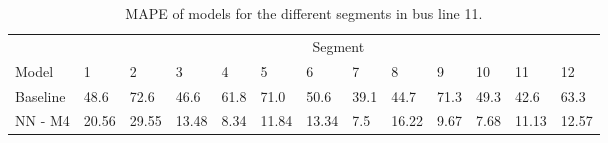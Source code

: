 \begin{table}[H]
	\centering
	\caption{MAPE of models for the different segments in bus line 11.}
	\label{fig:model-mape-of-segs-211}
	\begin{adjustbox}{center}
	\begin{tabular}{ l | l | l | l | l | l | l | l | l | l | l | l | l}
		& \multicolumn{12}{c}{Segment} \\
		Model       & 1 & 2 & 3 & 4 & 5 & 6 & 7 & 8 & 9 & 10 & 11 & 12 \\
		\hline
		Baseline  & 48.6 & 72.6 & 46.6 & 61.8 & 71.0 & 50.6 & 39.1 & 44.7 & 71.3 & 49.3  & 42.6 & 63.3 \\
		NN - M4         & 20.56& 29.55& 13.48& 8.34& 11.84& 13.34& 7.5& 16.22& 9.67& 7.68& 11.13& 12.57\\
	\end{tabular}
	\end{adjustbox}
\end{table}





